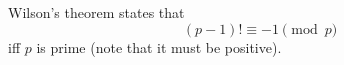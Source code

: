 \documentclass[12pt]{article}
\begin{document}
Wilson's theorem states that
$$ (p-1)! \equiv -1 \pmod{p} $$
iff $p$ is prime (note that it must be positive).
\end{document}
